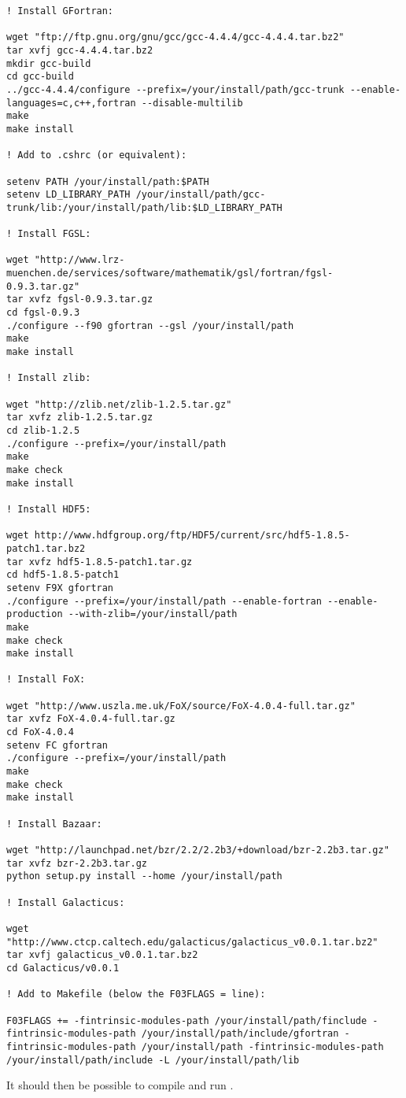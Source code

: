 \begin{lstlisting}[language=simple,stringstyle=\ttfamily,commentstyle=\itshape]
! Install GFortran:

wget "ftp://ftp.gnu.org/gnu/gcc/gcc-4.4.4/gcc-4.4.4.tar.bz2"
tar xvfj gcc-4.4.4.tar.bz2
mkdir gcc-build
cd gcc-build
../gcc-4.4.4/configure --prefix=/your/install/path/gcc-trunk --enable-languages=c,c++,fortran --disable-multilib
make
make install

! Add to .cshrc (or equivalent):

setenv PATH /your/install/path:$PATH                                                                                           
setenv LD_LIBRARY_PATH /your/install/path/gcc-trunk/lib:/your/install/path/lib:$LD_LIBRARY_PATH                                                                     

! Install FGSL:

wget "http://www.lrz-muenchen.de/services/software/mathematik/gsl/fortran/fgsl-0.9.3.tar.gz"
tar xvfz fgsl-0.9.3.tar.gz
cd fgsl-0.9.3
./configure --f90 gfortran --gsl /your/install/path
make
make install

! Install zlib:

wget "http://zlib.net/zlib-1.2.5.tar.gz"
tar xvfz zlib-1.2.5.tar.gz
cd zlib-1.2.5
./configure --prefix=/your/install/path
make
make check
make install

! Install HDF5:

wget http://www.hdfgroup.org/ftp/HDF5/current/src/hdf5-1.8.5-patch1.tar.bz2
tar xvfz hdf5-1.8.5-patch1.tar.gz
cd hdf5-1.8.5-patch1
setenv F9X gfortran
./configure --prefix=/your/install/path --enable-fortran --enable-production --with-zlib=/your/install/path
make
make check
make install

! Install FoX:

wget "http://www.uszla.me.uk/FoX/source/FoX-4.0.4-full.tar.gz"
tar xvfz FoX-4.0.4-full.tar.gz
cd FoX-4.0.4
setenv FC gfortran
./configure --prefix=/your/install/path
make
make check
make install

! Install Bazaar:

wget "http://launchpad.net/bzr/2.2/2.2b3/+download/bzr-2.2b3.tar.gz"
tar xvfz bzr-2.2b3.tar.gz
python setup.py install --home /your/install/path

! Install Galacticus:

wget "http://www.ctcp.caltech.edu/galacticus/galacticus_v0.0.1.tar.bz2"
tar xvfj galacticus_v0.0.1.tar.bz2
cd Galacticus/v0.0.1

! Add to Makefile (below the F03FLAGS = line):

F03FLAGS += -fintrinsic-modules-path /your/install/path/finclude -fintrinsic-modules-path /your/install/path/include/gfortran -fintrinsic-modules-path /your/install/path -fintrinsic-modules-path /your/install/path/include -L /your/install/path/lib
\end{lstlisting}

It should then be possible to compile and run \glc.

